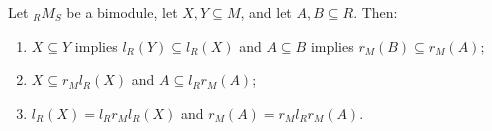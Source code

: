 Let ${}_R M_S$ be a bimodule, let $X, Y \subseteq M$, and let $A, B \subseteq R$. Then:

\begin{enumerate}
\item $X \subseteq Y$ implies $l_R(Y) \subseteq l_R(X)$ and $A \subseteq B$ implies $r_M(B) \subseteq r_M(A)$;
\item $X \subseteq r_M l_R(X)$ and $A \subseteq l_R r_M(A)$;
\item $l_R(X) = l_R r_M l_R(X)$ and $r_M(A) = r_M l_R r_M(A)$.
\end{enumerate}
